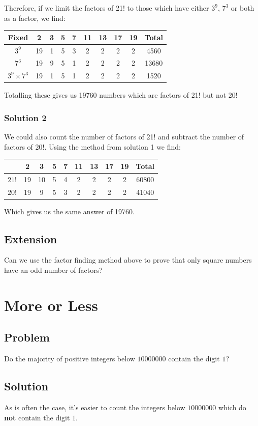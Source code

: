 \documentclass{book}
\begin{document}
Therefore, if we limit the factors of 21! to those which have either \(3^9\), \(7^3\) or both as a factor, we find:
\begin{center}
\begin{tabular}{ |c|c|c|c|c|c|c|c|c|c| }
\hline
Fixed & 2 & 3 & 5 & 7 & 11 & 13 & 17 & 19 & Total \\
\hline
\(3^9\) & 19 & 1 & 5 & 3 & 2 & 2 & 2 & 2 & 4560\\
\(7^3\) & 19 & 9 & 5 & 1 & 2 & 2 & 2 & 2 & 13680\\
\(3^9 \times 7^3\) & 19 & 1 & 5 & 1 & 2 & 2 & 2 & 2 & 1520\\
\hline
\end{tabular}
\end{center}
Totalling these gives us 19760 numbers which are factors of 21! but not 20!

\subsubsection{Solution 2}
We could also count the number of factors of 21! and subtract the number of factors of 20!. Using the method from solution 1 we find:
\begin{center}
\begin{tabular}{ |c|c|c|c|c|c|c|c|c|c| }
\hline
 & 2 & 3 & 5 & 7 & 11 & 13 & 17 & 19 & Total \\
\hline
\(21!\) & 19 & 10 & 5 & 4 & 2 & 2 & 2 & 2 & 60800\\
\(20!\) & 19 & 9 & 5 & 3 & 2 & 2 & 2 & 2 & 41040\\
\hline
\end{tabular}
\end{center}
Which gives us the same answer of 19760.
\subsection{Extension}
Can we use the factor finding method above to prove that only square numbers have an odd number of factors?
\newpage
\section{More or Less}
\subsection{Problem}
Do the majority of positive integers below \(10 000 000\) contain the digit \(1\)?
\subsection{Solution}
As is often the case, it's easier to count the integers below \(10000000\) which do \textbf{not} contain the digit \(1\).
\end{document}
